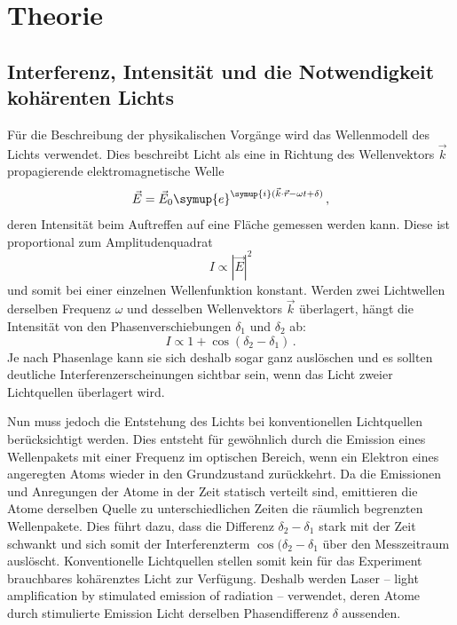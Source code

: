 \section{Theorie}
\label{sec:Theorie}

\subsection{Interferenz, Intensität und die Notwendigkeit kohärenten Lichts}

Für die Beschreibung der physikalischen Vorgänge wird das Wellenmodell des Lichts verwendet. 
Dies beschreibt Licht als eine in Richtung des Wellenvektors $\vec{k}$ propagierende elektromagnetische Welle
\begin{equation*}
    \vec{E}=\vec{E}_0 \symup{e}^{\symup{i}(\vec{k}\cdot \vec{r}-\omega t +\delta)}\,,
\end{equation*} 
deren Intensität beim Auftreffen auf eine Fläche gemessen werden kann. 
Diese ist proportional zum Amplitudenquadrat
\begin{equation*}
    I \propto |\vec{E}|^2
\end{equation*}
und somit bei einer einzelnen Wellenfunktion konstant. 
Werden zwei Lichtwellen derselben Frequenz $\omega$ und desselben Wellenvektors $\vec{k}$ überlagert, hängt die Intensität 
von den Phasenverschiebungen $\delta_1$ und $\delta_2$ ab: 
\begin{equation*}
    I \propto 1+\cos (\delta_2-\delta_1)\,.
\end{equation*}
Je nach Phasenlage kann sie sich deshalb sogar ganz auslöschen und es sollten deutliche Interferenzerscheinungen sichtbar sein, wenn 
das Licht zweier Lichtquellen überlagert wird. 

Nun muss jedoch die Entstehung des Lichts bei konventionellen Lichtquellen berücksichtigt werden. 
Dies entsteht für gewöhnlich durch die Emission eines Wellenpakets mit einer Frequenz im optischen Bereich, wenn ein Elektron 
eines angeregten Atoms wieder in den Grundzustand zurückkehrt. 
Da die Emissionen und Anregungen der Atome in der Zeit statisch verteilt sind, emittieren die Atome derselben Quelle zu unterschiedlichen Zeiten die 
räumlich begrenzten Wellenpakete.
Dies führt dazu, dass die Differenz $\delta_2-\delta_1$ stark mit der Zeit schwankt und sich somit der Interferenzterm $\cos (\delta_2-\delta_1$ 
über den Messzeitraum auslöscht. 
Konventionelle Lichtquellen stellen somit kein für das Experiment brauchbares kohärenztes Licht zur Verfügung. 
Deshalb werden Laser -- light amplification by stimulated emission of radiation -- verwendet, deren Atome durch 
stimulierte Emission Licht derselben Phasendifferenz $\delta$ aussenden. 

